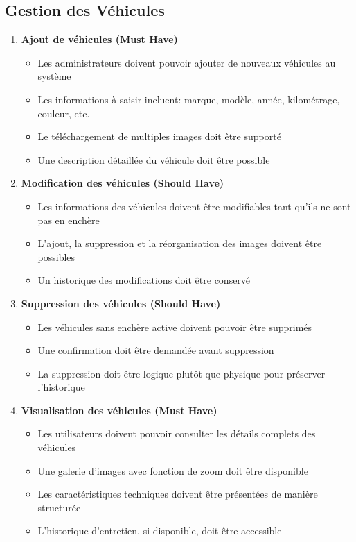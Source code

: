 \subsection{Gestion des Véhicules}

\begin{enumerate}
    \item \textbf{Ajout de véhicules (Must Have)}
    \begin{itemize}
        \item Les administrateurs doivent pouvoir ajouter de nouveaux véhicules au système
        \item Les informations à saisir incluent: marque, modèle, année, kilométrage, couleur, etc.
        \item Le téléchargement de multiples images doit être supporté
        \item Une description détaillée du véhicule doit être possible
    \end{itemize}
    
    \item \textbf{Modification des véhicules (Should Have)}
    \begin{itemize}
        \item Les informations des véhicules doivent être modifiables tant qu'ils ne sont pas en enchère
        \item L'ajout, la suppression et la réorganisation des images doivent être possibles
        \item Un historique des modifications doit être conservé
    \end{itemize}
    
    \item \textbf{Suppression des véhicules (Should Have)}
    \begin{itemize}
        \item Les véhicules sans enchère active doivent pouvoir être supprimés
        \item Une confirmation doit être demandée avant suppression
        \item La suppression doit être logique plutôt que physique pour préserver l'historique
    \end{itemize}
    
    \item \textbf{Visualisation des véhicules (Must Have)}
    \begin{itemize}
        \item Les utilisateurs doivent pouvoir consulter les détails complets des véhicules
        \item Une galerie d'images avec fonction de zoom doit être disponible
        \item Les caractéristiques techniques doivent être présentées de manière structurée
        \item L'historique d'entretien, si disponible, doit être accessible
    \end{itemize}
\end{enumerate}

